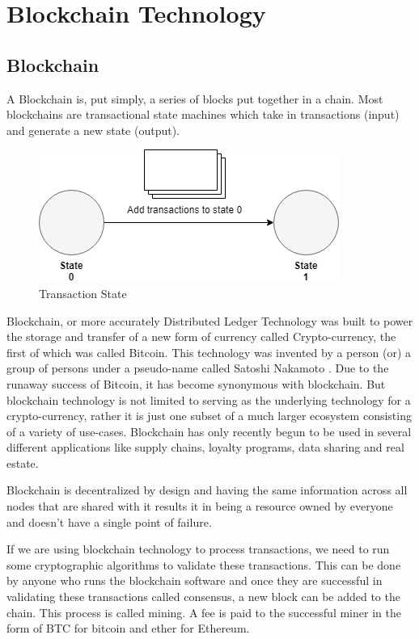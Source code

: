 \documentclass[11pt,openright]{report}
\begin{document}
\chapter{Blockchain Technology}
\label{chapter:blockchain_tech}
\section{Blockchain}
A Blockchain is, put simply, a series of blocks put together in a chain. Most blockchains are transactional state machines which take in transactions (input) and generate a new state (output).
\begin{figure}
	\centering
	\includegraphics[scale=0.5]{images/statemachine.png}
	\caption{Transaction State}
	\label{fig:State Change}
\end{figure}

Blockchain, or more accurately Distributed Ledger Technology was built to power the storage and transfer of a new form of currency called Crypto-currency, the first of which was called Bitcoin. This technology was invented by a person (or) a group of persons under a pseudo-name called Satoshi Nakamoto \cite{nakamoto2012bitcoin}. Due to the runaway success of Bitcoin, it has become synonymous with blockchain. But blockchain technology is not limited to serving as the underlying technology for a crypto-currency, rather it is just one subset of a much larger ecosystem consisting of a variety of use-cases. Blockchain has only recently begun to be used in several different applications like supply chains, loyalty programs, data sharing and real estate.

Blockchain is decentralized by design and having the same information across all nodes that are shared with it results it in being a resource owned by everyone and doesn’t have a single point of failure. 

If we are using blockchain technology to process transactions, we need to run some cryptographic algorithms to validate these transactions. This can be done by anyone who runs the blockchain software and once they are successful in validating these transactions called consensus, a new block can be added to the chain. This process is called mining. A fee is paid to the successful miner in the form of BTC for bitcoin and ether for Ethereum.
\end{document}
